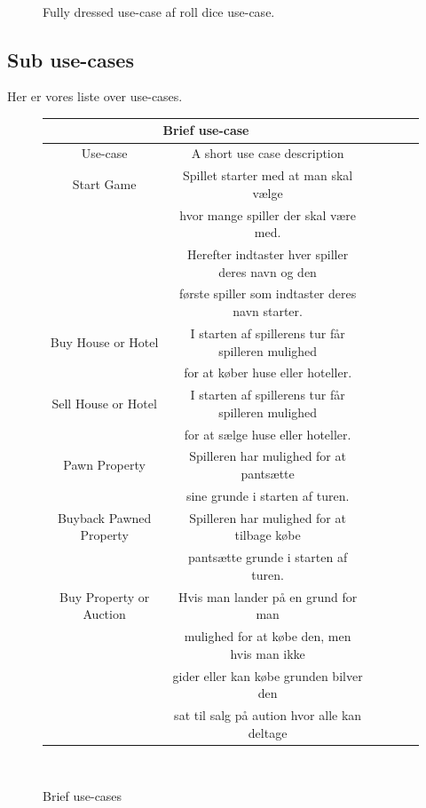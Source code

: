 \begin{flushleft}
\begin{figure}[htp]
\begin{tabular}{ |c|c|c|c|c|c|  }
    \end{tabular}\\
    \caption{Fully dressed use-case af roll dice use-case.}
\end{figure}
\doublespacing

\subsection{Sub use-cases}
Her er vores liste over use-cases.\\
\begin{figure}[htp]
    \centering
\begin{tabular}{ |c|c|c|c|c|c|  }
\hline
\multicolumn{2}{|c|}{Brief use-case} \\
\hline
Use-case & A short use case description \\
\hline
Start Game & Spillet starter med at man skal vælge \\
&hvor mange spiller der skal være med.\\
&Herefter indtaster hver spiller deres navn og den\\
&første spiller som indtaster deres navn starter.\\
\hline
Buy House or Hotel & I starten af spillerens tur får spilleren mulighed\\
&for at køber huse eller hoteller.\\
\hline
Sell House or Hotel & I starten af spillerens tur får spilleren mulighed\\
&for at sælge huse eller hoteller.\\
\hline
Pawn Property & Spilleren har mulighed for at pantsætte \\
&sine grunde i starten af turen.\\
\hline
Buyback Pawned Property & Spilleren har mulighed for at tilbage købe\\
&pantsætte grunde i starten af turen.\\
\hline
Buy Property or Auction & Hvis man lander på en grund for man \\
&mulighed for at købe den, men hvis man ikke\\
&gider eller kan købe grunden bilver den\\
&sat til salg på aution hvor alle kan deltage\\
\hline


    \end{tabular} \\
    \caption{Brief use-cases}
\end{figure}
\doublespacing



\end{flushleft}
